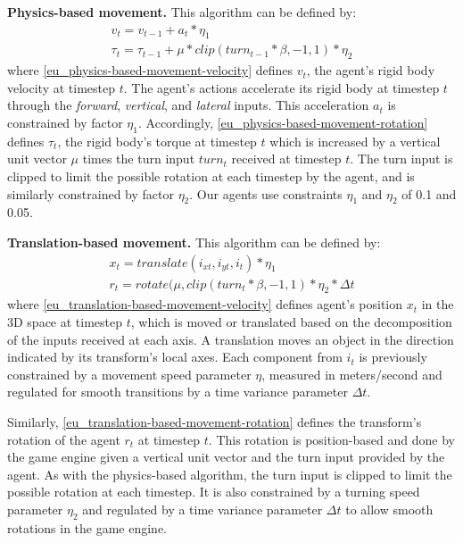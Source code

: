 \textbf{Physics-based movement.}
This algorithm can be defined by:
\begin{gather}
        v_t = v_{t-1} + a_t * \eta_1 \label{eu_physics-based-movement-velocity}
        \\    
        \tau_t = \tau_{t-1} + \mu * clip(turn_{t-1} * \beta, -1, 1) * \eta_2 \label{eu_physics-based-movement-rotation}
\end{gather}
where \ref{eu_physics-based-movement-velocity} defines $v_t$, the agent's rigid body velocity at timestep $t$.
The agent's actions accelerate its rigid body at timestep $t$ through the \textit{forward}, \textit{vertical}, and \textit{lateral} inputs. 
This acceleration $a_t$ is constrained by factor $\eta_1$. 
Accordingly, \ref{eu_physics-based-movement-rotation} defines $\tau_t$, the rigid body's torque at timestep $t$ which is increased by a vertical unit vector $\mu$ times the turn input $turn_t$ received at timestep $t$. The turn input is clipped to limit the possible rotation at each timestep by the agent, and is similarly constrained by factor $\eta_2$.
Our agents use constraints $\eta_1$ and $\eta_2$ of 0.1 and 0.05.


\textbf{Translation-based movement.}
This algorithm can be defined by:
\begin{gather}
    x_t = translate(i_{xt}, i_{yt}, i_t) * \eta_1 \label{eu_translation-based-movement-velocity}
    \\
    r_t = rotate(\mu, clip(turn_t * \beta, -1, 1) * \eta_2 * \Delta t \label{eu_translation-based-movement-rotation}
\end{gather}
where \ref{eu_translation-based-movement-velocity} defines agent's position $x_t$ in the 3D space at timestep $t$, which is moved or translated based on the decomposition of the inputs received at each axis. A translation moves an object in the direction indicated by its transform's local axes. Each component from $i_t$ is previously constrained by a movement speed parameter $\eta$, measured in meters/second and regulated for smooth transitions by a time variance parameter $\Delta t$. 

Similarly, \ref{eu_translation-based-movement-rotation} defines the transform's rotation of the agent $r_t$ at timestep $t$. This rotation is position-based and done by the game engine given a vertical unit vector and the turn input provided by the agent. As with the physics-based algorithm, the turn input is clipped to limit the possible rotation at each timestep. It is also constrained by a turning speed parameter $\eta_2$ and regulated by a time variance parameter $\Delta t$ to allow smooth rotations in the game engine.

